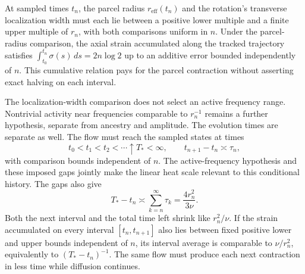 At sampled times \(t_n\), the parcel radius \(r_{\mathrm{eff}}(t_n)\) and the rotation's transverse localization width must each lie between a positive lower multiple and a finite upper multiple of \(r_n\), with both comparisons uniform in \(n\). Under the parcel-radius comparison, the axial strain accumulated along the tracked trajectory satisfies \(\int_{t_0}^{t_n}\sigma(s)\,ds=2n\log 2\) up to an additive error bounded independently of \(n\). This cumulative relation pays for the parcel contraction without asserting exact halving on each interval.

The localization-width comparison does not select an active frequency range. Nontrivial activity near frequencies comparable to \(r_n^{-1}\) remains a further hypothesis, separate from ancestry and amplitude. The evolution times are separate as well. The flow must reach the sampled states at times
\[
  t_0<t_1<t_2<\cdots\uparrow T_*<\infty,
  \qquad
  t_{n+1}-t_n\asymp\tau_n,
\]
with comparison bounds independent of \(n\). The active-frequency hypothesis and these imposed gaps jointly make the linear heat scale relevant to this conditional history. The gaps also give
\[
  T_*-t_n
  \asymp
  \sum_{k=n}^{\infty}\tau_k
  =
  \frac{4r_n^2}{3\nu}.
\]
Both the next interval and the total time left shrink like \(r_n^2/\nu\). If the strain accumulated on every interval \([t_n,t_{n+1}]\) also lies between fixed positive lower and upper bounds independent of \(n\), its interval average is comparable to \(\nu/r_n^2\), equivalently to \((T_*-t_n)^{-1}\). The same flow must produce each next contraction in less time while diffusion continues.
